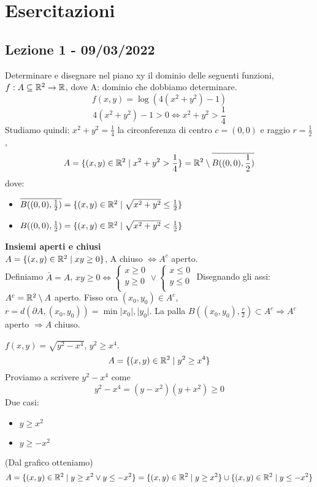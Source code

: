 \chapter{Esercitazioni}
\section{Lezione 1 - 09/03/2022}
\begin{eexercise}
  Determinare e disegnare nel piano xy il dominio delle seguenti funzioni, $f: A \subseteq \mathbb{R}^2 \to \mathbb{R}$, dove A: dominio che dobbiamo determinare.
  $$f(x,y) = \log(4(x^2+y^2)-1)$$
  \sol $$4(x^2+y^2)-1 > 0 \iff x^2+y^2 > \frac{1}{4}$$
  Studiamo quindi: $x^2+y^2 = \frac{1}{4}$ la circonferenza di centro $c=(0,0)$ e raggio $r = \frac{1}{2}$,
  $$A = \{(x,y)\in \mathbb{R}^2 \mid x^2+y^2 > \frac{1}{4}\} = \mathbb{R}^2 \setminus \overline{B((0,0), \frac{1}{2})}$$
  dove:
  \begin{itemize}
    \item $\overline{B((0,0), \frac{1}{2})} = \{(x,y)\in\mathbb{R}^2 \mid \sqrt{x^2+y^2} \leq \frac{1}{2}\}$
    \item $B((0,0), \frac{1}{2}) = \{(x,y)\in\mathbb{R}^2 \mid \sqrt{x^2+y^2} < \frac{1}{2}\}$
  \end{itemize}
  \hfill\break 
  \textbf{Insiemi aperti e chiusi}\\
  $A = \{(x,y)\in \mathbb{R}^2\mid xy\geq 0\}$, A \ace chiuso $\iff A^c$ \ace aperto.\\
  Definiamo $\bar{A} = A$, $xy \geq 0 \iff \left\{\begin{array}{c}
    x \geq 0 \\
    y \geq 0 \\
  \end{array}\right. \vee \left\{\begin{array}{c}
    x \leq 0 \\
    y \leq 0 \\
  \end{array}\right.$
  Disegnando gli assi: \\
  $A^c = \mathbb{R}^2 \setminus A$ \ace aperto. Fisso ora $(x_0,y_0) \in A^c$, $r = d(\partial A, (x_0,y_0)) = \min{\lvert x_0 \rvert, \lvert y_0 \rvert}$. 
  La palla $B((x_0,y_0), \frac{r}{2}) \subset A^c \Rightarrow A^c $ \ace aperto $\Rightarrow A $ \ace chiuso.
\end{eexercise}
\begin{eexercise}
  $f(x,y) = \sqrt{y^2-x^4}$, $y^2 \geq x^4$. $$A=\{(x,y)\in\mathbb{R}^2 \mid y^2\geq x^4\}$$
  Proviamo a scrivere $y^2-x^4$ come 
  $$y^2-x^4 = (y-x^2)(y+x^2) \geq 0$$
  Due casi:
  \begin{itemize}
    \item $y \geq x^2$
    \item $y \geq -x^2$
  \end{itemize} 
  (Dal grafico otteniamo)
  $$A = \{(x,y)\in\mathbb{R}^2 \mid y \geq x^2 \vee y \leq -x^2\} = \{(x,y)\in\mathbb{R}^2 \mid y \geq x^2\} \cup \{(x,y)\in\mathbb{R}^2 \mid y \leq -x^2\}$$
\end{eexercise}
